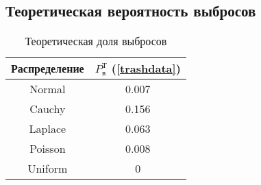 \subsection{Теоретическая вероятность выбросов}

\begin{table}[H]
	\begin{center}
		\begin{tabular}{|c|c|}
			\hline			
			Распределение & $P_{\text{в}}^{\text{Т}}$ (\ref{trashdata})
			\\
			\hline			
			Normal & 0.007 \\
			\hline
			Cauchy & 0.156 \\
			\hline
			Laplace & 0.063 \\
			\hline			
			Poisson & 0.008 \\
			\hline		
			Uniform & 0 \\
			\hline			
		\end{tabular}
		\caption{Теоретическая доля выбросов}
		\label{tabl:tabl_name}
	\end{center}
\end{table}
